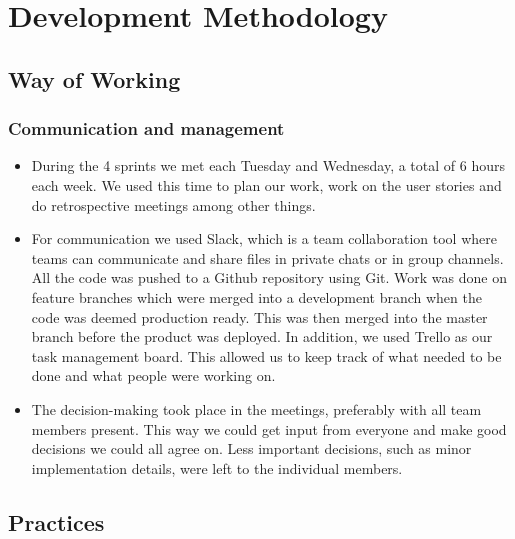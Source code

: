 \section {Development Methodology}
\subsection{Way of Working}
\subsubsection{Communication and management}
\begin{itemize}
    \item During the 4 sprints we met each Tuesday and Wednesday, a total of 6 hours each week. We used this time to plan our work, work on the user stories and do retrospective meetings among other things. 
    \item For communication we used Slack, which is a team collaboration tool where teams can communicate and share files in private chats or in group channels. All the code was pushed to a Github repository using Git. Work was done on feature branches which were merged into a development branch when the code was deemed production ready. This was then merged into the master branch before the product was deployed. In addition, we used Trello as our task management board. This allowed us to keep track of what needed to be done and what people were working on. 
    \item The decision-making took place in the meetings, preferably with all team members present. This way we could get input from everyone and make good decisions we could all agree on. Less important decisions, such as minor implementation details, were left to the individual members.   
\end{itemize}

\subsection{Practices}
